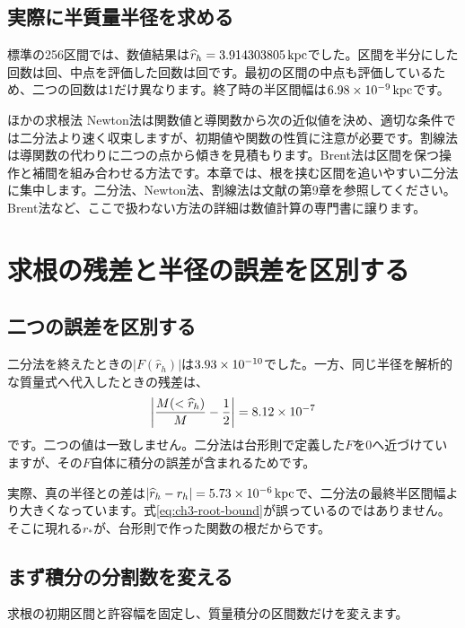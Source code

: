 \subsection{実際に半質量半径を求める}
標準の256区間では、数値結果は$\widehat r_h=3.914303805\,\mathrm{kpc}$でした。区間を半分にした回数は\chthreevalRootHalvings 回、中点を評価した回数は\chthreevalRootCalls 回です。最初の区間の中点も評価しているため、二つの回数は1だけ異なります。終了時の半区間幅は$6.98\times 10^{-9}\,\mathrm{kpc}$です。

\begin{notebox}{ほかの求根法}
Newton法は関数値と導関数から次の近似値を決め、適切な条件では二分法より速く収束しますが、初期値や関数の性質に注意が必要です。割線法は導関数の代わりに二つの点から傾きを見積もります。Brent法は区間を保つ操作と補間を組み合わせる方法です。本章では、根を挟む区間を追いやすい二分法に集中します。二分法、Newton法、割線法は文献\cite{sugiura2009}の第9章を参照してください。Brent法など、ここで扱わない方法の詳細は数値計算の専門書に譲ります。
\end{notebox}

\section{求根の残差と半径の誤差を区別する}
\label{sec:ch3-root-errors}
\subsection{二つの誤差を区別する}
二分法を終えたときの$|F(\widehat r_h)|$は$3.93\times 10^{-10}$でした。一方、同じ半径を解析的な質量式へ代入したときの残差は、
\[
 \left|\frac{M(<\widehat r_h)}{M}-\frac12\right|=8.12\times 10^{-7}
\]
です。二つの値は一致しません。二分法は台形則で定義した$F$を0へ近づけていますが、その$F$自体に積分の誤差が含まれるためです。

実際、真の半径との差は$|\widehat r_h-r_h|=5.73\times 10^{-6}\,\mathrm{kpc}$で、二分法の最終半区間幅より大きくなっています。式\eqref{eq:ch3-root-bound}が誤っているのではありません。そこに現れる$r_\ast$が、台形則で作った関数の根だからです。

\subsection{まず積分の分割数を変える}
求根の初期区間と許容幅を固定し、質量積分の区間数だけを変えます。
\begin{table}[htbp]
\centering
\caption{積分の区間数による半質量半径の変化。二分法の許容半区間幅は全行で$10^{-8}\unit{kpc}$です。小さな数値残差が得られていても、真の半径との差には区間数への依存が残ります。}
\label{tab:ch3-root-convergence}
\small
\end{table}

